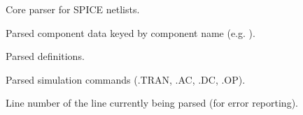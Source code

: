 \documentclass[letterpaper,10pt,english]{sphinxmanual}
\begin{document}
\begin{fulllineitems}
\label{\detokenize{parser:NetlistParser}}
\pysigstartsignatures
\pysigline
{}
\pysigstopsignatures
\sphinxAtStartPar
Core parser for SPICE netlists.

\begin{fulllineitems}
\label{\detokenize{parser:NetlistParser.components}}
\pysigstartsignatures
\pysigline
{}
\pysigstopsignatures
\sphinxAtStartPar
{} \textendash{} Parsed component data keyed by component name (e.g. ).

\end{fulllineitems}


\begin{fulllineitems}
\label{\detokenize{parser:NetlistParser.models}}
\pysigstartsignatures
\pysigline
{}
\pysigstopsignatures
\sphinxAtStartPar
{} \textendash{} Parsed  definitions.

\end{fulllineitems}


\begin{fulllineitems}
\label{\detokenize{parser:NetlistParser.analyses}}
\pysigstartsignatures
\pysigline
{}
\pysigstopsignatures
\sphinxAtStartPar
{} \textendash{} Parsed simulation commands (.TRAN, .AC, .DC, .OP).

\end{fulllineitems}


\begin{fulllineitems}
\label{\detokenize{parser:NetlistParser.current_line}}
\pysigstartsignatures
\pysigline
{}
\pysigstopsignatures
\sphinxAtStartPar
{} \textendash{} Line number of the line currently being parsed (for error reporting).


\end{fulllineitems}
\end{fulllineitems}
\end{document}
